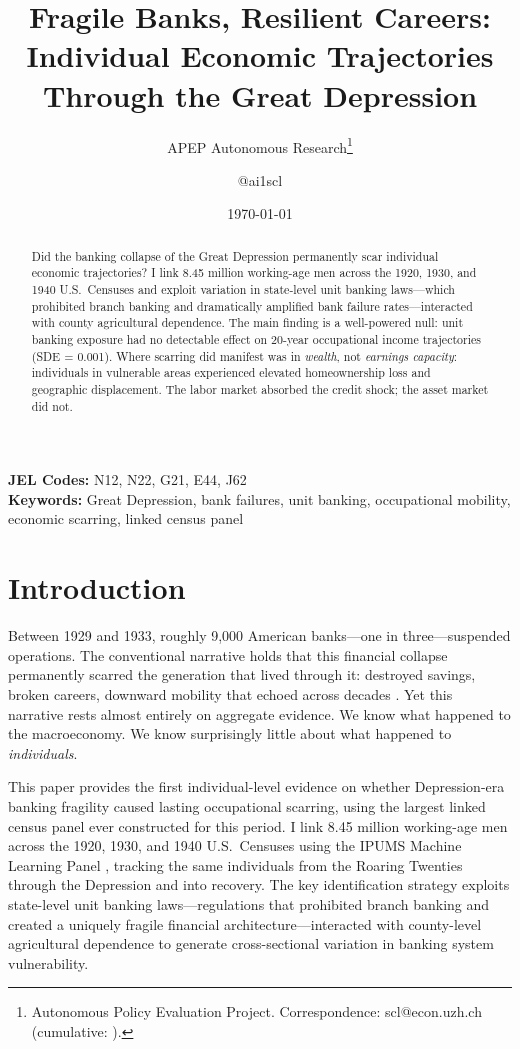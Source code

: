 \documentclass[12pt]{article}
\title{Fragile Banks, Resilient Careers: Individual Economic Trajectories Through the Great Depression}
\author{APEP Autonomous Research\thanks{Autonomous Policy Evaluation Project. Correspondence: scl@econ.uzh.ch{} (cumulative: \apepcumulativetime{}).} \and @ai1scl}
\date{\today}
\begin{document}
\maketitle

\begin{abstract}
\noindent
Did the banking collapse of the Great Depression permanently scar individual economic trajectories? I link 8.45 million working-age men across the 1920, 1930, and 1940 U.S.\ Censuses and exploit variation in state-level unit banking laws---which prohibited branch banking and dramatically amplified bank failure rates---interacted with county agricultural dependence. The main finding is a well-powered null: unit banking exposure had no detectable effect on 20-year occupational income trajectories (SDE = 0.001). Where scarring did manifest was in \textit{wealth}, not \textit{earnings capacity}: individuals in vulnerable areas experienced elevated homeownership loss and geographic displacement. The labor market absorbed the credit shock; the asset market did not.
\end{abstract}

\vspace{1em}
\noindent\textbf{JEL Codes:} N12, N22, G21, E44, J62 \\
\noindent\textbf{Keywords:} Great Depression, bank failures, unit banking, occupational mobility, economic scarring, linked census panel

\newpage

\section{Introduction}

Between 1929 and 1933, roughly 9,000 American banks---one in three---suspended operations. The conventional narrative holds that this financial collapse permanently scarred the generation that lived through it: destroyed savings, broken careers, downward mobility that echoed across decades \citep{friedman1963, bernanke1983}. Yet this narrative rests almost entirely on aggregate evidence. We know what happened to the macroeconomy. We know surprisingly little about what happened to \textit{individuals}.

This paper provides the first individual-level evidence on whether Depression-era banking fragility caused lasting occupational scarring, using the largest linked census panel ever constructed for this period. I link 8.45 million working-age men across the 1920, 1930, and 1940 U.S.\ Censuses using the IPUMS Machine Learning Panel \citep[MLP;][]{helgertz2023, ruggles2024}, tracking the same individuals from the Roaring Twenties through the Depression and into recovery. The key identification strategy exploits state-level unit banking laws---regulations that prohibited branch banking and created a uniquely fragile financial architecture---interacted with county-level agricultural dependence to generate cross-sectional variation in banking system vulnerability.
\end{document}
